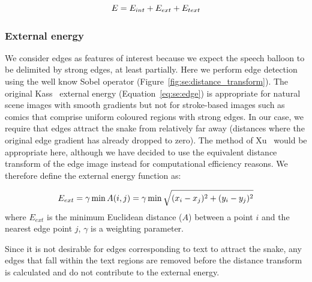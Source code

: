 \begin{equation}\label{eq:se:energy2}
  E = E_{int} + E_{ext} + E_{text}\\
\end{equation}

\subsubsection{External energy}
\label{sec:se:external_energie}

We consider edges as features of interest because we expect the speech balloon to be delimited by strong edges, at least partially.
Here we perform edge detection using the well know Sobel operator (Figure~\ref{fig:se:distance_transform}).
The original Kass~\cite{Kass1988} external energy (Equation~\ref{eq:se:edge}) is appropriate for natural scene images with smooth gradients but not for stroke-based images such as comics that comprise uniform coloured regions with strong edges.
In our case, we require that edges attract the snake from relatively far away (distances where the original edge gradient has already dropped to zero).
The method of Xu~\cite{Xu1998} would be appropriate here, although we have decided to use the equivalent distance transform of the edge image instead for computational efficiency reasons.
We therefore define the external energy function as:

\begin{equation}\label{eq:se:energy3}
  E_{ext} = \gamma \min A(i,j) = \gamma \min  \sqrt{(x_i-x_j)^2+(y_i-y_j)^2}\\
\end{equation}
where $E_{ext}$ is the minimum Euclidean distance ($A$) between a point $i$ and the nearest edge point $j$, $\gamma$ is a weighting parameter.

Since it is not desirable for edges corresponding to text to attract the snake, any edges that fall within the text regions are removed before the distance transform is calculated and do not contribute to the external energy.
	
